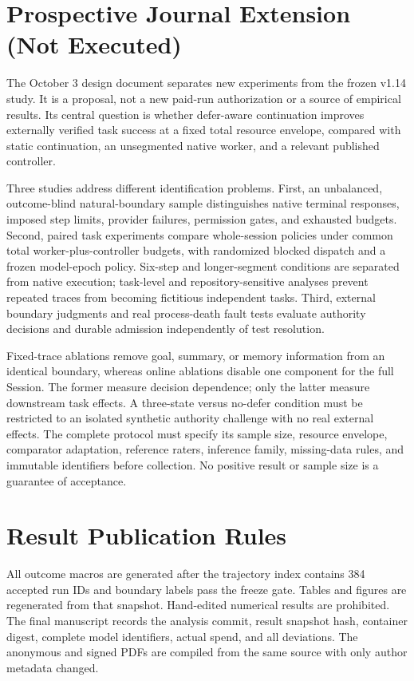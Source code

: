 \section{Prospective Journal Extension (Not Executed)}

The October 3 design document separates new experiments from the frozen v1.14 study. It is a proposal, not a new paid-run authorization or a source of empirical results. Its central question is whether defer-aware continuation improves externally verified task success at a fixed total resource envelope, compared with static continuation, an unsegmented native worker, and a relevant published controller.

Three studies address different identification problems. First, an unbalanced, outcome-blind natural-boundary sample distinguishes native terminal responses, imposed step limits, provider failures, permission gates, and exhausted budgets. Second, paired task experiments compare whole-session policies under common total worker-plus-controller budgets, with randomized blocked dispatch and a frozen model-epoch policy. Six-step and longer-segment conditions are separated from native execution; task-level and repository-sensitive analyses prevent repeated traces from becoming fictitious independent tasks. Third, external boundary judgments and real process-death fault tests evaluate authority decisions and durable admission independently of test resolution.

Fixed-trace ablations remove goal, summary, or memory information from an identical boundary, whereas online ablations disable one component for the full Session. The former measure decision dependence; only the latter measure downstream task effects. A three-state versus no-defer condition must be restricted to an isolated synthetic authority challenge with no real external effects. The complete protocol must specify its sample size, resource envelope, comparator adaptation, reference raters, inference family, missing-data rules, and immutable identifiers before collection. No positive result or sample size is a guarantee of acceptance.

\section{Result Publication Rules}

All outcome macros are generated after the trajectory index contains 384 accepted run IDs and boundary labels pass the freeze gate. Tables and figures are regenerated from that snapshot. Hand-edited numerical results are prohibited. The final manuscript records the analysis commit, result snapshot hash, container digest, complete model identifiers, actual spend, and all deviations. The anonymous and signed PDFs are compiled from the same source with only author metadata changed.


